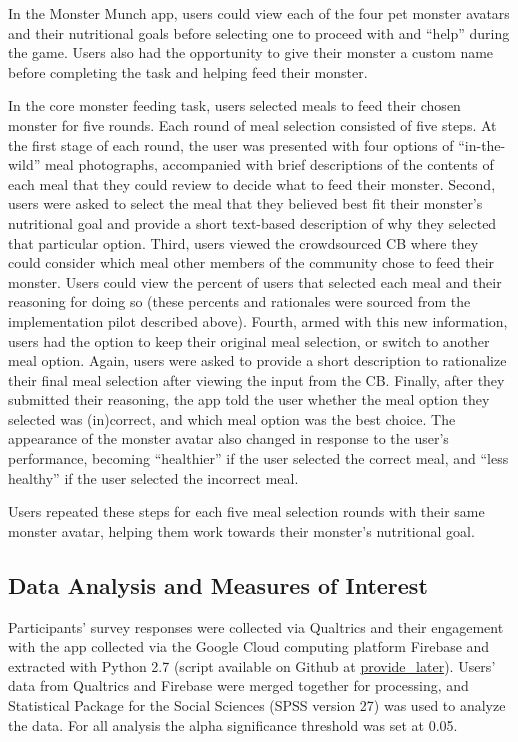 In the Monster Munch app, users could view each of the four pet monster avatars and their nutritional goals before selecting one to proceed with and ``help'' during the game. Users also had the opportunity to give their monster a custom name before completing the task and helping feed their monster.

In the core monster feeding task, users selected meals to feed their chosen monster for five rounds. Each round of meal selection consisted of five steps. 
At the first stage of each round, the user was presented with  four options of ``in-the-wild'' meal photographs, accompanied with brief descriptions of the contents of each meal that they could review to decide what to feed their monster. Second, users were asked to select the meal that they believed best fit their monster’s nutritional goal and provide a short text-based description of why they selected that particular option. Third, users viewed the crowdsourced CB where they could consider which meal other members of the community chose to feed their monster. Users could view the percent of users that selected each meal and their reasoning for doing so (these percents and rationales were sourced from the implementation pilot described above). Fourth, armed with this new information, users had the option to keep their original meal selection, or switch to another meal option. Again, users were asked to provide a short description to rationalize their final meal selection after viewing the input from the CB.
Finally, after they submitted their reasoning, the app told the user whether the meal option they selected was (in)correct, and which meal option was the best choice. The appearance of the monster avatar also changed in response to the user's performance, becoming ``healthier'' if the user selected the correct meal, and ``less healthy'' if the user selected the incorrect meal. 

Users repeated these steps for each five meal selection rounds with their same  monster avatar, helping them work towards their monster's nutritional goal.
\vspace{-5pt}
\subsection{Data Analysis and Measures of Interest}
Participants' survey responses were collected via Qualtrics and their engagement with the app  collected via the Google Cloud computing platform Firebase and extracted with Python 2.7 (script available on Github at \url{provide_later}). Users' data from Qualtrics and Firebase were merged together for processing, and 
Statistical Package for the Social Sciences (SPSS version 27) was used to analyze the data. For all analysis the alpha significance threshold was set at 0.05.  


